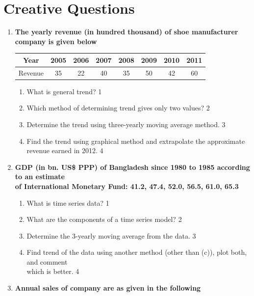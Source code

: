 \documentclass[a4paper,oneside]{book}
\begin{document}
\section{Creative Questions}
  \begin{enumerate}

   \item
	  \textbf{The yearly revenue (in hundred thousand) of shoe manufacturer company is given below} 
  \begin{table}[h]
\centering
\begin{tabular}{cccccccc}
Year     & 2005 & 2006 & 2007 & 2008 & 2009 & 2010 & 2011 \\ \hline
Revenue & 35   & 22    & 40     & 35     & 50     & 42 & 60   
\end{tabular}
\end{table}
  
  \begin{enumerate}
    \item
	What is general trend? \hfill 1
    \item
	Which method of determining trend gives only two values? \hfill 2
    \item  
	Determine the trend using three-yearly moving average method. \hfill 3
    \item
	Find the trend using graphical method and extrapolate the approximate revenue earned in 2012. \hfill 4
  \end{enumerate}

 \item
	  \textbf{GDP (in bn. US\$ PPP) of Bangladesh since 1980 to 1985 according to an estimate \\ of International  Monetary Fund: 41.2, 47.4, 52.0, 56.5, 61.0, 65.3}
  \begin{enumerate}
    \item
	What is time series data? \hfill 1
    \item
	What are the components of a time series model? \hfill 2
    \item  
	Determine the 3-yearly moving average from the data. \hfill 3
    \item
	Find trend of the data using another method (other than (c)), plot both, and comment \\ which is better. \hfill 4
\end{enumerate}

 \item
	  \textbf{Annual sales of company are as given in the following}\
	  

\end{enumerate}
\end{document}
